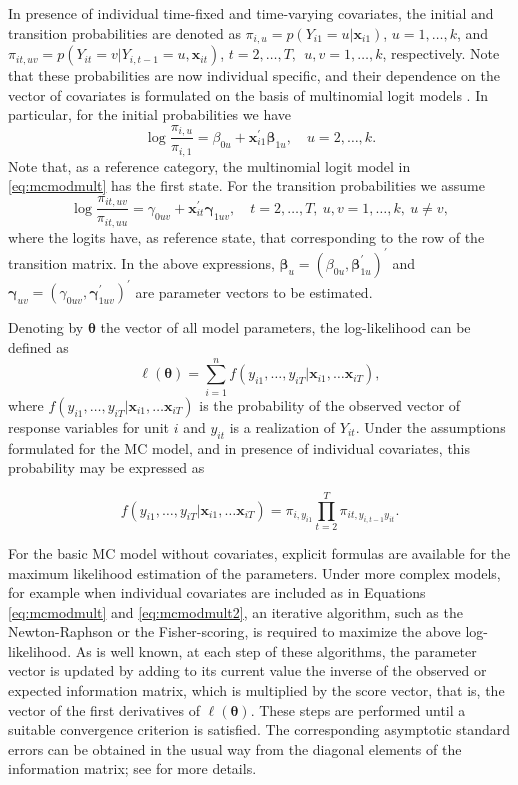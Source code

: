 In presence of individual time-fixed and time-varying covariates, the
initial and transition probabilities are denoted as
\(\pi_{i,u}= p(Y_{i1} = u |\boldsymbol{x}_{i1})\), \(u=1,\ldots,k\), and
\(\pi_{it,uv} = p(Y_{it} = v | Y_{i,t-1}= u, \boldsymbol{x}_{it})\),
\(t=2,\ldots,T,\:\ u,v=1,\ldots,k\), respectively. Note that these
probabilities are now individual specific, and their dependence on the
vector of covariates is formulated on the basis of multinomial logit
models \citep{azzalini:94}. In particular, for the initial probabilities
we have
\begin{equation}
\log\frac{\pi_{i,u}}{\pi_{i,1}}= \beta_{0u} + \boldsymbol{x}_{i1}^\prime \boldsymbol{\beta}_{1u},\quad u=2,\ldots,k.
\label{eq:mcmodmult}
\end{equation} Note that, as a reference category, the multinomial logit
model in \eqref{eq:mcmodmult} has the first state. For the transition
probabilities we assume
\begin{equation}
\log\frac{\pi_{it,uv}}{\pi_{it,uu}}= \gamma_{0uv} + \boldsymbol{x}_{it}^\prime \boldsymbol{\gamma}_{1uv},\quad t=2,\ldots,T, \: u,v = 1,\ldots,k,\: u \neq v,
 \label{eq:mcmodmult2}
\end{equation} where the logits have, as reference state, that
corresponding to the row of the transition matrix. In the above
expressions, \(\boldsymbol{\beta}_u = (\beta_{0u}, \boldsymbol{\beta}_{1u}^\prime)^\prime\)
and \(\boldsymbol{\gamma}_{uv} = (\gamma_{0uv},\boldsymbol{\gamma}_{1uv}^\prime)^\prime\)
are parameter vectors to be estimated.

Denoting by \(\boldsymbol{\theta}\) the vector of all model parameters, the
log-likelihood can be defined as \[
\ell(\boldsymbol{\theta}) = \sum_{i=1}^n f(y_{i1},\ldots,y_{iT}|\boldsymbol{x}_{i1},\ldots \boldsymbol{x}_{iT}),
\] where \(f(y_{i1},\ldots,y_{iT}|\boldsymbol{x}_{i1},\ldots \boldsymbol{x}_{iT})\) is the
probability of the observed vector of response variables for unit \(i\)
and \(y_{it}\) is a realization of \(Y_{it}\). Under the assumptions
formulated for the MC model, and in presence of individual covariates,
this probability may be expressed as

\[
f(y_{i1},\ldots,y_{iT}|\boldsymbol{x}_{i1},\ldots \boldsymbol{x}_{iT}) = \pi_{i,y_{i1}} \prod_{t=2}^{T}\pi_{it,y_{i,t-1}y_{it}}.
\]

For the basic MC model without covariates, explicit formulas are
available for the maximum likelihood estimation of the parameters. Under
more complex models, for example when individual covariates are included
as in Equations \eqref{eq:mcmodmult} and \eqref{eq:mcmodmult2}, an
iterative algorithm, such as the Newton-Raphson or the Fisher-scoring,
is required to maximize the above log-likelihood. As is well known, at
each step of these algorithms, the parameter vector is updated by adding
to its current value the inverse of the observed or expected information
matrix, which is multiplied by the score vector, that is, the vector of
the first derivatives of \(\ell(\boldsymbol{\theta})\). These steps are performed
until a suitable convergence criterion is satisfied. The corresponding
asymptotic standard errors can be obtained in the usual way from the
diagonal elements of the information matrix; see
\cite{bart:farc:penn:14} for more details.

